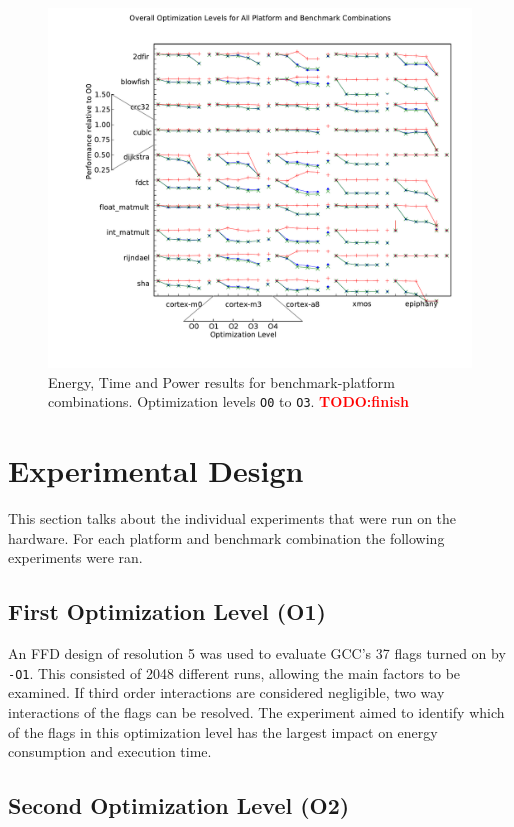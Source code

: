 \documentclass[twocolumn]{article}
\newcommand{\nsection}[1]{\section{\bfseries #1}}
\newcommand{\todo}[1]{\textbf{\textcolor{red}{#1}}}
\let\oldcaption\caption
\renewcommand{\caption}[1]{\oldcaption{\textup{#1}}}
\begin{document}
\begin{figure}[tb!]
	\centering
	\includegraphics[width=\textwidth,clip, trim=2cm 1.5cm 0 2cm]{levels.pdf}
	\caption{Energy, Time and Power results for benchmark-platform combinations. Optimization levels \texttt{O0} to \texttt{O3}. \todo{TODO:finish}}
	\label{Fig:OverallView}
\end{figure}

\nsection{Experimental Design}

This section talks about the individual experiments that were run on the hardware. For each platform and benchmark combination the following experiments were ran.

\subsection*{First Optimization Level (O1)}

An FFD design of resolution 5 was used to evaluate GCC's 37 flags turned on by \texttt{-O1}. This consisted of 2048 different runs, allowing the main factors to be examined. If third order interactions are considered negligible, two way interactions of the flags can be resolved. The experiment aimed to identify which of the flags in this optimization level has the largest impact on energy consumption and execution time.

\subsection*{Second Optimization Level (O2)}
\end{document}
